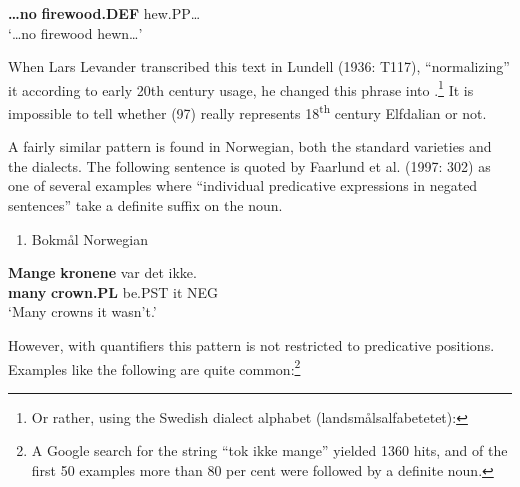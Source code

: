\textbf{…no} \textbf{firewood.DEF} hew.PP…\\ %


‘…no firewood hewn…’
\z


When Lars Levander transcribed this text in Lundell (1936: T117), “normalizing” it according to early 20th century usage, he changed this phrase into .\footnote{ Or rather, using the Swedish dialect alphabet (landsmålsalfabetetet):  }\textit{ }It is impossible to tell whether (97) really represents 18\textsuperscript{th} century Elfdalian or not. 

A fairly similar pattern is found in Norwegian, both the standard varieties and the dialects. The following sentence is quoted by Faarlund et al. (1997: 302) as one of several examples where “individual predicative expressions in negated sentences” take a definite suffix on the noun. 

\begin{enumerate} %
\item 
Bokmål Norwegian 

\end{enumerate} %
\ea\label{}
\gll \textbf{Mange}\textbf{  kronene} var  det  ikke.\\


\textbf{many} \textbf{crown.PL} be.PST  it  NEG\\ %


‘Many crowns it wasn’t.’
\z


However, with quantifiers this pattern is not restricted to predicative positions. Examples like the following are quite common:\footnote{ A Google search for the string “tok ikke mange” yielded 1360 hits, and of the first 50 examples more than 80 per cent were followed by a definite noun.}

